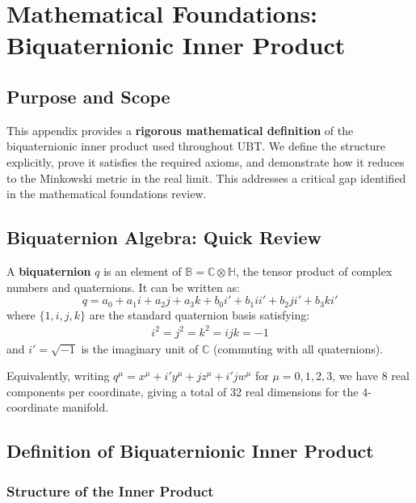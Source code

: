\section{Mathematical Foundations: Biquaternionic Inner Product}
\label{app:biquaternion_inner_product}

\subsection{Purpose and Scope}

This appendix provides a \textbf{rigorous mathematical definition} of the biquaternionic inner product used throughout UBT. We define the structure explicitly, prove it satisfies the required axioms, and demonstrate how it reduces to the Minkowski metric in the real limit. This addresses a critical gap identified in the mathematical foundations review.

\subsection{Biquaternion Algebra: Quick Review}

A \textbf{biquaternion} $q$ is an element of $\mathbb{B} = \mathbb{C} \otimes \mathbb{H}$, the tensor product of complex numbers and quaternions. It can be written as:
\begin{equation}
q = a_0 + a_1 i + a_2 j + a_3 k + b_0 i' + b_1 ii' + b_2 ji' + b_3 ki'
\end{equation}
where $\{1, i, j, k\}$ are the standard quaternion basis satisfying:
\begin{align}
i^2 = j^2 = k^2 = ijk = -1
\end{align}
and $i' = \sqrt{-1}$ is the imaginary unit of $\mathbb{C}$ (commuting with all quaternions).

Equivalently, writing $q^{\mu} = x^{\mu} + i' y^{\mu} + j z^{\mu} + i'j w^{\mu}$ for $\mu = 0,1,2,3$, we have 8 real components per coordinate, giving a total of 32 real dimensions for the 4-coordinate manifold.

\subsection{Definition of Biquaternionic Inner Product}

\subsubsection{Structure of the Inner Product}

